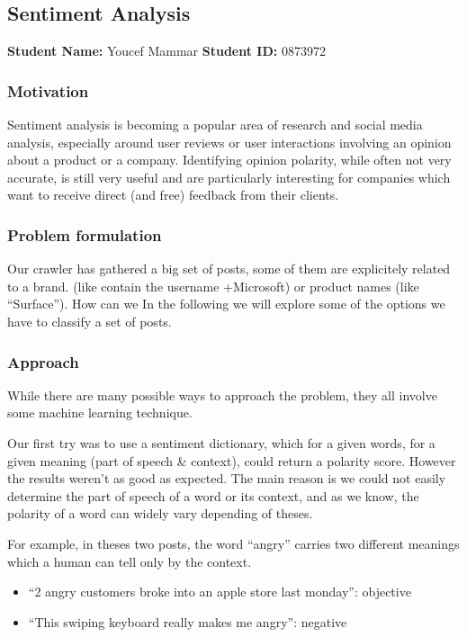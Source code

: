 \subsection{\label{sec:sentiment}Sentiment Analysis}
\textbf{Student Name: }Youcef Mammar \textbf{Student ID:} 0873972\\

\subsubsection*{Motivation}
Sentiment analysis is becoming a popular area of research and social media analysis,
especially around user reviews or user interactions involving an opinion about a product
or a company. Identifying opinion polarity, while often not very accurate, is still very
useful and are particularly interesting for companies which want to receive direct (and free)
feedback from their clients.

\subsubsection*{Problem formulation}
Our crawler has gathered a big set of posts, some of them are explicitely related to a brand.
(like contain the username +Microsoft) or product names (like “Surface”). How can we
In the following we will explore some of the options we have to classify a set of posts.



\subsubsection*{Approach}

While there are many possible ways to approach the problem, they all involve some machine learning technique.

Our first try was to use a sentiment dictionary, which for a given words, for a given meaning (part of speech \&
context), could return a polarity score. However the results weren’t as good as expected. The main reason is we
could not easily determine the part of speech of a word or its context, and as we know, the polarity of a word can widely vary depending of theses.

For example, in theses two posts, the word “angry” carries two different meanings which a human can tell only by the context.
\begin{itemize}
 \item ``2 angry customers broke into an apple store last monday'': objective
 \item ``This swiping keyboard really makes me angry'': negative

\end{itemize}


